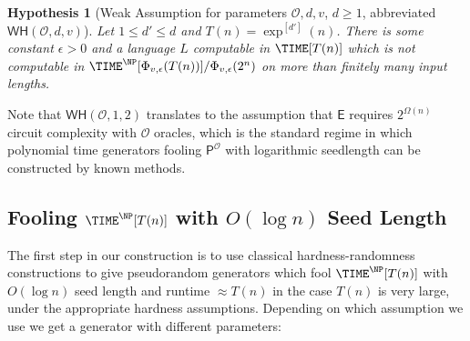 \documentclass[11pt]{article}
\newtheorem{hypothesis}{Hypothesis}
\newcommand{\semi}[2]{\Phi_{#1,#2}}
\newcommand{\WH}{\mathsf{WH}}
\begin{document}
\begin{hypothesis}[Weak Assumption for parameters $\mathcal{O},d,v$, $d \geq 1$, abbreviated $\WH(\mathcal{O},d,v)$]\label{hyp:weak}
Let $1 \leq d' \leq d$ and $T(n) = \exp^{[d']}(n)$. There is some constant $\epsilon > 0$ and a language $L$ computable in $\TIME[T(n)]$ which is not computable in $\TIME^\NP[\semi{v}{\epsilon}(T(n))]/\semi{v}{\epsilon}(2^n)$ on more than finitely many input lengths.
\end{hypothesis}
Note that $\WH(\mathcal{O},1,2)$ translates to the assumption that $\mathsf{E}$ requires $2^{\Omega(n)}$ circuit complexity with $\mathcal{O}$ oracles, which is the standard regime in which polynomial time generators fooling $\mathsf{P}^{\mathcal{O}}$ with logarithmic seedlength can be constructed by known methods.

\subsection{Fooling $\TIME^{\NP}[T(n)]$ with $O(\log n)$ Seed Length}
The first step in our construction is to use classical hardness-randomness constructions to give pseudorandom generators which fool $\TIME^{\NP}[T(n)]$ with $O(\log n)$ seed length and runtime $\approx T(n)$ in the case $T(n)$ is very large, under the appropriate hardness assumptions. Depending on which assumption we use we get a generator with different parameters:
\end{document}
